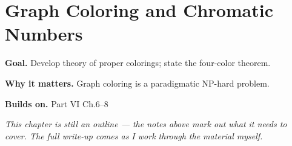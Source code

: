 \chapter{Graph Coloring and Chromatic Numbers}
\label{ch:06-combinatorics-and-graph-theory-09}

\begin{chapterintro}
\textbf{Goal.} Develop theory of proper colorings; state the four-color theorem.

\textbf{Why it matters.} Graph coloring is a paradigmatic NP-hard problem.

\textbf{Builds on.} Part VI Ch.6–8
\end{chapterintro}

\textit{This chapter is still an outline --- the notes above mark out what it needs to cover. The full write-up comes as I work through the material myself.}
